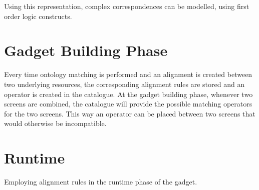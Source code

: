 Using this representation, complex correspondences can be modelled, using first order logic constructs.

\section{Gadget Building Phase}
Every time ontology matching is performed and an alignment is created between two underlying resources, the corresponding alignment rules are stored and an operator is created in the catalogue. At the gadget building phase, whenever two screens are combined, the catalogue will provide the possible matching operators for the two screens. This way an operator can be placed between two screens that would otherwise be incompatible.

\section{Runtime} 
Employing alignment rules in the runtime phase of the gadget.